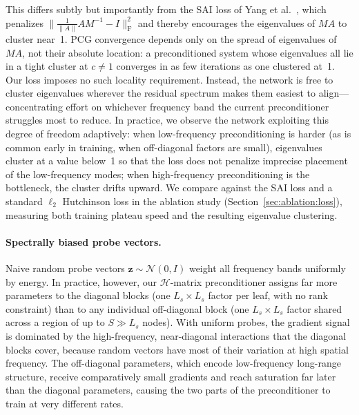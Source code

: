 \documentclass[acmtog,anonymous,review]{acmart}
\begin{document}
This differs subtly but importantly from the SAI loss of Yang et al.~\cite{yang2025sparse},
which penalizes $\bigl\|\frac{1}{\|A\|} A M^{-1} - I\bigr\|_{\mathrm{F}}^2$ and thereby encourages the eigenvalues of $MA$ to
cluster near~1.  PCG convergence depends only on the spread of eigenvalues of $MA$, not their
absolute location: a preconditioned system whose eigenvalues all lie in a tight cluster at $c
\neq 1$ converges in as few iterations as one clustered at~1.  Our loss imposes no such locality
requirement.  Instead, the network is free to cluster eigenvalues wherever the residual spectrum
makes them easiest to align---concentrating effort on whichever frequency band the current
preconditioner struggles most to reduce.  In practice, we observe the network exploiting this
degree of freedom adaptively: when low-frequency preconditioning is harder (as is common early in
training, when off-diagonal factors are small), eigenvalues cluster at a value below~1 so that
the loss does not penalize imprecise placement of the low-frequency modes; when high-frequency
preconditioning is the bottleneck, the cluster drifts upward.  We compare against the SAI loss
and a standard $\ell_2$ Hutchinson loss in the ablation study (Section~\ref{sec:ablation:loss}),
measuring both training plateau speed and the resulting eigenvalue clustering.

\paragraph{Spectrally biased probe vectors.}
Naive random probe vectors $\mathbf{z} \sim \mathcal{N}(0, I)$ weight all frequency bands
uniformly by energy.  In practice, however, our $\mathcal{H}$-matrix preconditioner assigns far
more parameters to the diagonal blocks (one $L_s \times L_s$ factor per leaf, with no rank
constraint) than to any individual off-diagonal block (one $L_s \times L_s$ factor shared across
a region of up to $S \gg L_s$ nodes).  With uniform probes, the gradient signal is dominated by
the high-frequency, near-diagonal interactions that the diagonal blocks cover, because random
vectors have most of their variation at high spatial frequency.  The off-diagonal parameters,
which encode low-frequency long-range structure, receive comparatively small gradients and reach
saturation far later than the diagonal parameters, causing the two parts of the preconditioner to
train at very different rates.
\end{document}
